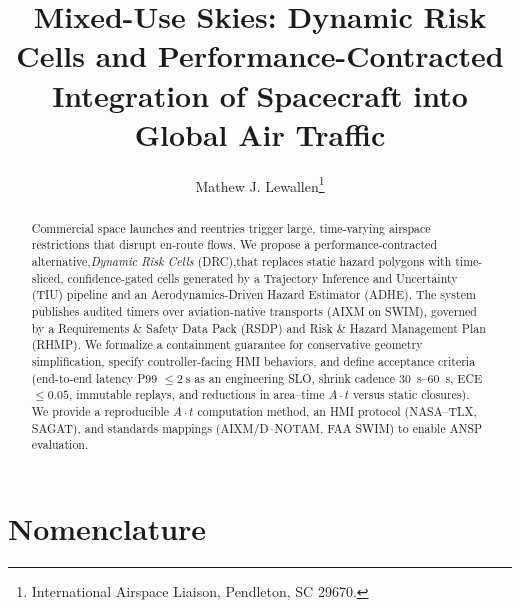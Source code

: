 \documentclass[journal]{new-aiaa}
\title{Mixed-Use Skies: Dynamic Risk Cells and Performance-Contracted Integration of Spacecraft into Global Air Traffic}
\author{Mathew J. Lewallen\footnote{International Airspace Liaison, Pendleton, SC 29670.}}
\affil{Aerospace Post, Pendleton, S.C., 29670, U.S.A.}
\newcommand{\At}{\ensuremath{A\cdot t}}
\newcommand{\TIU}{\textsc{TIU}}
\newcommand{\ADHE}{\textsc{ADHE}}
\newcommand{\RSDP}{\textsc{RSDP}}
\newcommand{\RHMP}{\textsc{RHMP}}
\begin{document}
\maketitle

\begin{abstract}
Commercial space launches and reentries trigger large, time-varying airspace restrictions that disrupt en-route flows. We propose a performance-contracted alternative,\emph{Dynamic Risk Cells} (DRC),that replaces static hazard polygons with time-sliced, confidence-gated cells generated by a Trajectory Inference and Uncertainty (\TIU) pipeline and an Aerodynamics-Driven Hazard Estimator (\ADHE). The system publishes audited timers over aviation-native transports (AIXM on SWIM), governed by a Requirements \& Safety Data Pack (\RSDP) and Risk \& Hazard Management Plan (\RHMP). We formalize a containment guarantee for conservative geometry simplification, specify controller-facing HMI behaviors, and define acceptance criteria (end-to-end latency P99 $\le\SI{2}{\second}$ as an engineering SLO, shrink cadence \SIrange{30}{60}{\second}, ECE $\le 0.05$, immutable replays, and reductions in area–time ${\At}$ versus static closures). We provide a reproducible ${\At}$ computation method, an HMI protocol (NASA–TLX, SAGAT), and standards mappings (AIXM/D–NOTAM, FAA SWIM) to enable ANSP evaluation.
\end{abstract}

\section*{Nomenclature}
\end{document}
